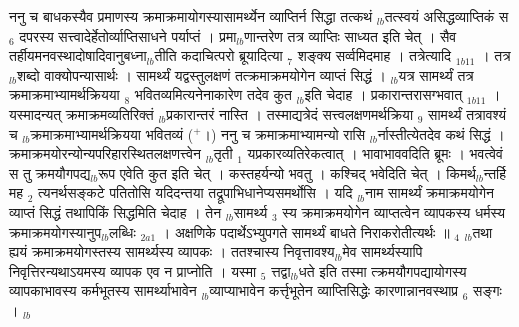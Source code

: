 \documentclass[article,12pt,a4paper]{memoir}%
\newcommand{\add}[1]{($^{+}$#1)}
\newcounter{parCount}
\begin{document}
	  
	  \pstart \leavevmode%
	ननु च बाधकस्यैव प्रमाणस्य क्रमाक्रमायोगस्यासामर्थ्येन व्याप्तिर्न सिद्धा तत्कथं {\tiny $_{lb}$}तत्स्वयं असिद्धव्याप्तिकं स {\tiny $_{6}$} दपरस्य सत्त्वादेर्हेतोर्व्याप्तिसाधने पर्याप्तं । प्रमा{\tiny $_{lb}$}णान्तरेण तत्र व्याप्तिः साध्यत इति चेत् । सैव तर्हीयमनवस्थादोषादिवानुबध्ना{\tiny $_{lb}$}तीति कदाचित्परो ब्रूयादित्या {\tiny $_{7}$} शङ्क्य सर्व्वमिदमाह । {\color{DodgerBlue3}तत्रेत्यादि} {\tiny $_{1b11}$} । तत्र {\tiny $_{lb}$}शब्दो वाक्योपन्यासार्थः । सामर्थ्यं यद्वस्तुलक्षणं {\color{DodgerBlue3}तत्क्रमाक्रमयोगेन व्याप्तं सिद्धं} । {\tiny $_{lb}$}यत्र सामर्थ्यं तत्र क्रमाक्रमाभ्यामर्थक्रियया {\tiny $_{8}$} भवितव्यमित्यनेनाकारेण तदेव कुत {\tiny $_{lb}$}इति चेदाह । {\color{DodgerBlue3}प्रकारान्तरासग्भवात्} {\tiny $_{1b11}$} । यस्मादन्यत् क्रमाक्रमव्यतिरिक्तं {\tiny $_{lb}$}प्रकारान्तरं नास्ति । तस्माद्यत्रेदं सत्त्वलक्षणमर्थक्रिया {\tiny $_{9}$} \leavevmode{} सामर्थ्यं तत्रावश्यं च {\tiny $_{lb}$}क्रमाक्रमाभ्यामर्थक्रियया भवितव्यं \add{।} ननु च क्रमाक्रमाभ्यामन्यो रासि {\tiny $_{lb}$}\leavevmode{}र्नास्तीत्येतदेव कथं सिद्धं । क्रमाक्रमयोरन्योन्यपरिहारस्थितलक्षणत्त्वेन {\tiny $_{lb}$}तृती {\tiny $_{1}$} यप्रकारव्यतिरेकत्वात् । भावाभाववदिति ब्रूमः । भवत्वेवं स तु क्रमयौगपद्य{\tiny $_{lb}$}रूप एवेति कुत इति चेत् । कस्तहर्यन्यो भवतु । कश्चिद् भवेदिति चेत् । किमर्थ{\tiny $_{lb}$}न्तर्हि मह {\tiny $_{2}$} त्यनर्थसङ्कटे पतितोसि यदिदन्तया तद्रूपाभिधानेप्यसमर्थोसि । यदि {\tiny $_{lb}$}नाम सामर्थ्यं क्रमाक्रमयोगेन व्याप्तं सिद्धं तथापिकिं सिद्धमिति चेदाह । तेन {\tiny $_{lb}$}सामर्थ्य {\tiny $_{3}$} स्य क्रमाक्रमयोगेन व्याप्तत्वेन {\color{DodgerBlue3}व्यापकस्य धर्मस्य} क्रमाक्रमयोगस्यानुप{\tiny $_{lb}$}लब्धिः {\tiny $_{2a1}$} । {\color{DodgerBlue3}अक्षणिके} पदार्थेऽभ्युपगते {\color{DodgerBlue3}सामर्थ्यं बाधते} निराकरोतीत्यर्थः ॥ {\tiny $_{4}$} {\tiny $_{lb}$}तथा ह्ययं क्रमाक्रमयोगस्तस्य सामर्थ्यस्य व्यापकः । ततश्चास्य निवृत्तावश्य{\tiny $_{lb}$}मेव सामर्थ्यस्यापि निवृत्तिरन्यथाऽयमस्य व्यापक एव न प्राप्नोति । यस्मा {\tiny $_{5}$} त्तद्वा{\tiny $_{lb}$}धते इति तस्मा {\color{DodgerBlue3}त्क्रमयौगपद्यायोगस्य} व्यापकाभावस्य कर्मभूतस्य {\color{DodgerBlue3}सामर्थ्याभावेन} {\tiny $_{lb}$}व्याप्याभावेन कर्त्तृभूतेन व्याप्तिसिद्धेः कारणान्नानवस्थाप्र {\tiny $_{6}$} सङ्गः ।
	{}
	\pend%
      {\tiny $_{lb}$}
\end{document}
